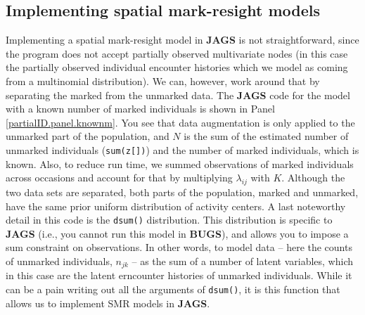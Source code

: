 \subsection{Implementing spatial mark-resight models}
Implementing a spatial mark-resight model in {\bf JAGS} is not
straightforward,
since the program does not accept partially observed
multivariate nodes (in this case the partially observed individual
encounter histories which we model as coming from a multinomial
distribution).  
We can, however, work around that by separating the
marked from the unmarked data. The {\bf JAGS} code for the model with
a known number of marked individuals is shown in Panel
\ref{partialID.panel.knownm}. You see that data augmentation is only
applied to the unmarked part of the population, and $N$ is the sum of
the estimated number of unmarked individuals ({\tt sum(z[])}) and the
number of marked individuals, which is known. Also, to reduce run
time, we summed observations of marked individuals across occasions
and account for that by multiplying $\lambda_{ij}$ with $K$. Although
the two data sets are separated, both parts of the population, marked
and unmarked, have the same prior uniform distribution of activity
centers.  A last noteworthy detail in this code is the {\tt dsum()}
distribution.  This distribution is specific to {\bf JAGS} (i.e., you
cannot run this model in {\bf BUGS}), and allows you to
impose a sum constraint on observations.
In other words, to  model data --
here the counts of unmarked individuals, $n_{jk}$ -- as the sum of a
number of latent variables, which in this case are the latent
erncounter histories of unmarked individuals. While it can be a pain
writing out all the arguments of {\tt dsum()}, it is this function
that allows us to implement SMR models in {\bf JAGS}.


